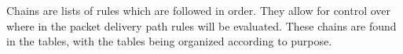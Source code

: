 Chains are lists of rules which are followed in order. They allow for control over where in the packet delivery path rules will be evaluated. These chains are found in the tables, with the tables being organized according to purpose.